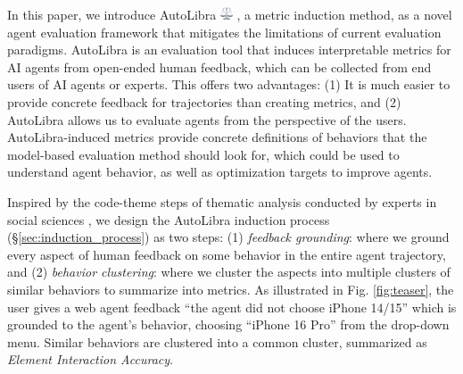 In this paper, we introduce AutoLibra \protect
\includegraphics[height=1em]{figs/scale.png}
, a metric induction method, as a novel agent evaluation framework that
mitigates the limitations of current evaluation paradigms. AutoLibra is an evaluation
tool that induces interpretable metrics for AI agents from open-ended human feedback,
which can be collected from end users of AI agents or experts. This offers two
advantages: (1) It is much easier to provide concrete feedback for trajectories
than creating metrics, and (2) AutoLibra allows us to evaluate agents from the perspective
of the users. AutoLibra-induced metrics provide concrete definitions of
behaviors that the model-based evaluation method should look for, which could be used to understand agent behavior, as well as
optimization targets to improve agents.

Inspired by the code-theme steps of thematic analysis conducted by experts in
social sciences \citep{braun2006using}, we design the AutoLibra induction
process (\S\ref{sec:induction_process}) as two steps: (1) \emph{feedback
grounding}: where we ground every aspect of human feedback on some behavior in
the entire agent trajectory, and (2) \emph{behavior clustering}: where we cluster
the aspects into multiple clusters of similar behaviors to summarize into metrics.
As illustrated in Fig. \ref{fig:teaser}, the user gives a web agent feedback ``the
agent did not choose iPhone 14/15'' which is grounded to the agent's behavior, choosing
``iPhone 16 Pro'' from the drop-down menu. Similar behaviors are clustered into
a common cluster, summarized as \textit{Element Interaction Accuracy}.



